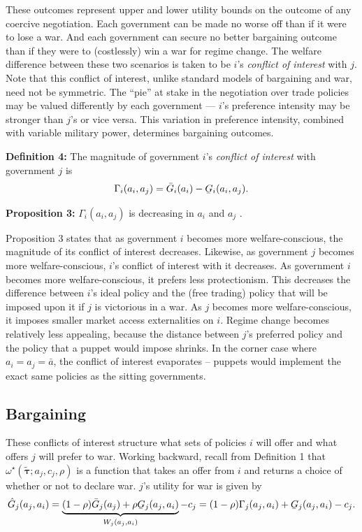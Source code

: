 \documentclass{puthesis}
\DeclareRobustCommand{\ubar}[1]{\underaccent{\bar}{#1}}
\begin{document}
These outcomes represent upper and lower utility bounds on the outcome
of any coercive negotiation. Each government can be made no worse off
than if it were to lose a war. And each government can secure no better
bargaining outcome than if they were to (costlessly) win a war for
regime change. The welfare difference between these two scenarios is
taken to be \(i\)'s \emph{conflict of interest} with \(j\). Note that
this conflict of interest, unlike standard models of bargaining and war,
need not be symmetric. The ``pie'' at stake in the negotiation over
trade policies may be valued differently by each government --- \(i\)'s
preference intensity may be stronger than \(j\)'s or vice versa. This
variation in preference intensity, combined with variable military
power, determines bargaining outcomes.

\textbf{Definition 4:} The magnitude of government \(i\)'s
\emph{conflict of interest} with government \(j\) is
\begin{equation} \label{eq:Gamma}
\Gamma_i(a_i, a_j) = \bar{G}_i(a_i) - \ubar{G}_i(a_i, a_j) .
\end{equation}

\textbf{Proposition 3:} \(\Gamma_i(a_i, a_j)\) is decreasing in \(a_i\)
and \(a_j\) .

Proposition 3 states that as government \(i\) becomes more
welfare-conscious, the magnitude of its conflict of interest decreases.
Likewise, as government \(j\) becomes more welfare-conscious, \(i\)'s
conflict of interest with it decreases. As government \(i\) becomes more
welfare-conscious, it prefers less protectionism. This decreases the
difference between \(i\)'s ideal policy and the (free trading) policy
that will be imposed upon it if \(j\) is victorious in a war. As \(j\)
becomes more welfare-conscious, it imposes smaller market access
externalities on \(i\). Regime change becomes relatively less appealing,
because the distance between \(j\)'s preferred policy and the policy
that a puppet would impose shrinks. In the corner case where
\(a_i = a_j = \bar{a}\), the conflict of interest evaporates -- puppets
would implement the exact same policies as the sitting governments.

\subsection{Bargaining}

These conflicts of interest structure what sets of policies \(i\) will
offer and what offers \(j\) will prefer to war. Working backward, recall
from Definition 1 that
\(\omega^\star(\tilde{\bm{\tau}}; a_j, c_j, \rho)\) is a function that
takes an offer from \(i\) and returns a choice of whether or not to
declare war. \(j\)'s utility for war is given by
\begin{equation*} \label{eq:Ghatj}
\hat{G}_j(a_j, a_i) = \underbrace{(1 - \rho) \bar{G}_j(a_j) + \rho \ubar{G}_j(a_j, a_i)}_{W_j(a_j, a_i)} - c_j = (1 - \rho) \Gamma_j(a_j, a_i) + \ubar{G}_j(a_j, a_i) - c_j .
\end{equation*}
\end{document}
